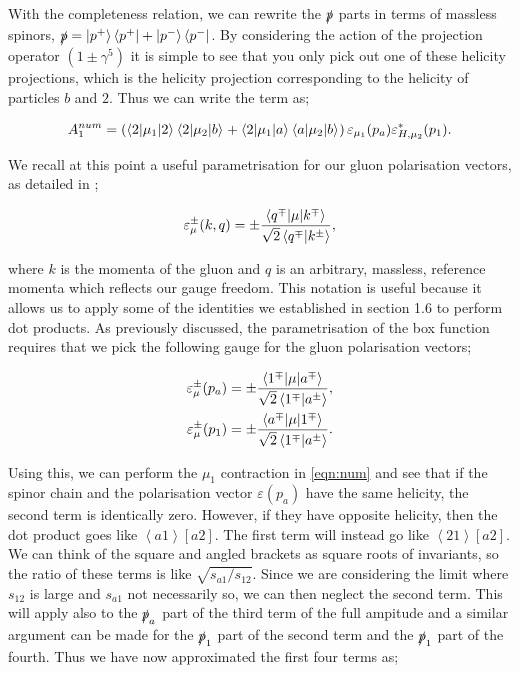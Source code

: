 With the completeness relation, we can rewrite the $\slashed{p}$ parts in terms of massless spinors,  $\slashed{p} = \left| p^+ \right> \left<p^+ \right| + \left| p^- \right> \left<p^- \right|$. By considering the action of the projection operator $(1\pm \gamma^5)$ it is simple to see that you only pick out one of these helicity projections, which is the helicity projection corresponding to the helicity of particles $b$ and $2$. Thus we can write the term as;

\begin{equation}
A_1^{num} = \left(\mathinner{\langle2\vert\mu_1\vert2\rangle}_{}\mathinner{\langle2\vert\mu_2\vert b\rangle}_{} + \mathinner{\langle2\vert\mu_1\vert a\rangle}_{}\mathinner{\langle a\vert\mu_2\vert b\rangle}_{}\right)\varepsilon_{\mu_1}(p_a)\varepsilon^*_{H,\mu_2}(p_1).
\label{eqn:num}
\end{equation}

We recall at this point a useful parametrisation for our gluon polarisation vectors, as detailed in \cite{Dixon1996};

\begin{equation}
\varepsilon_\mu^{\pm}(k,q) = \pm \frac{\mathinner{\langle q^\mp\vert\mu\vert k^\mp\rangle}_{}}{\sqrt{2} \left<q^\mp | k^\pm \right>},
\end{equation}

where $k$ is the momenta of the gluon and $q$ is an arbitrary, massless, reference momenta which reflects our gauge freedom. This notation is useful because it allows us to apply some of the identities we established in section 1.6 to perform dot products. As previously discussed, the parametrisation of the box function requires that we pick the following gauge for the gluon polarisation vectors;

\begin{equation}
\begin{split}
\varepsilon_\mu^{\pm}(p_a) &= \pm \frac{\mathinner{\langle1^\mp\vert\mu\vert a^\mp\rangle}_{}}{\sqrt{2} \left<1^\mp | a^\pm \right>}, \\
\varepsilon_\mu^{\pm}(p_1) &= \pm \frac{\mathinner{\langle a^\mp\vert\mu\vert1^\mp\rangle}_{}}{\sqrt{2} \left<1^\mp | a^\pm \right>}.
\end{split}
\end{equation}

Using this, we can perform the $\mu_1$ contraction in \ref{eqn:num} and see that if the spinor chain and the polarisation vector $\varepsilon(p_a)$ have the same helicity, the second term is identically zero. However, if they have opposite helicity, then the dot product goes like $\left<a 1 \right> [ a 2]$. The first term will instead go like $\left<2 1 \right>[a 2]$. We can think of the square and angled brackets as square roots of invariants, so the ratio of these terms is like $\sqrt{s_{a1}/s_{12}}$. 
Since we are considering the limit where $s_{12}$ is large and $s_{a1}$ not necessarily so, we can then neglect the second term. This will apply also to the $\slashed{p}_a$ part of the third term of the full ampitude and a similar argument can be made for the $\slashed{p}_1$ part of the second term and the $\slashed{p}_1$ part of the fourth. Thus we have now approximated the first four terms as;

